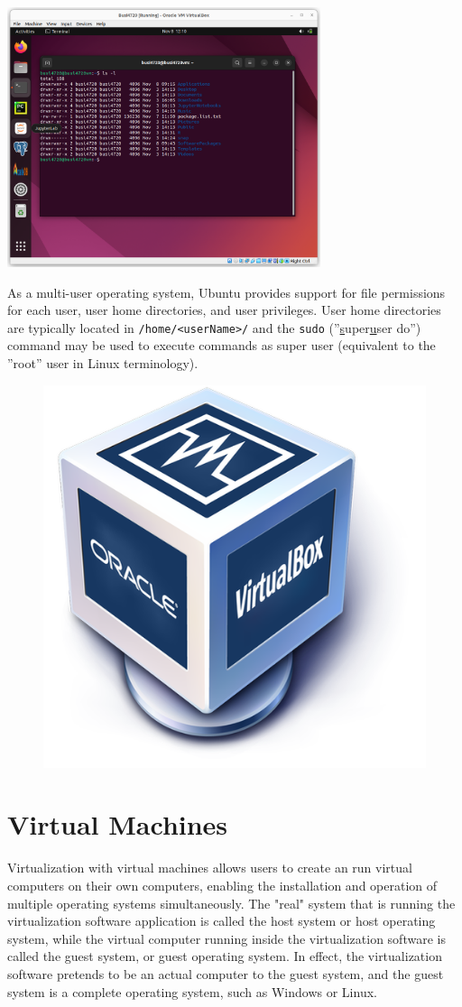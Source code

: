 \begin{center}
\includegraphics[height=3in]{screenshot1.png}
\end{center}

As a multi-user operating system, Ubuntu provides support for file permissions for each user, user home directories, and user privileges. User home directories are typically located in \texttt{/home/<userName>/} and the \texttt{sudo} (''\underline{s}uper\underline{u}ser do'') command may be used to execute commands as super user (equivalent to the ''root'' user in Linux terminology).
 
\begin{figure}
\begin{center}
\includegraphics[height=.5in]{Virtualbox_logo.png}
\end{center}
\end{figure}
 
\section{Virtual Machines}
 
Virtualization with virtual machines allows users to create an run virtual computers on their own computers, enabling the installation and operation of multiple operating systems simultaneously. The "real" system that is running the virtualization software application is called the host system or host operating system, while the virtual computer running inside the virtualization software is called the guest system, or guest operating system. In effect, the virtualization software pretends to be an actual computer to the guest system, and the guest system is a complete operating system, such as Windows or Linux.

